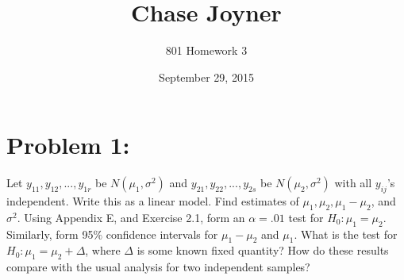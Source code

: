\documentclass[11pt]{article}
\title{Chase Joyner}
\author{801 Homework 3}
\date{September 29, 2015}
\begin{document}
\maketitle
\section*{Problem 1:}
Let $y_{11},y_{12},...,y_{1r}$ be $N(\mu_1,\sigma^2)$ and $y_{21},y_{22},...,y_{2s}$ be $N(\mu_2,\sigma^2)$ with all $y_{ij}$'s independent.  Write this as a linear model.  Find estimates of $\mu_1,\mu_2,\mu_1-\mu_2$, and $\sigma^2$.  Using Appendix E, and Exercise 2.1, form an $\alpha = .01$ test for $H_0\colon \mu_1 = \mu_2$.  Similarly, form 95$\%$ confidence intervals for $\mu_1-\mu_2$ and $\mu_1$.  What is the test for $H_0\colon\mu_1 = \mu_2 + \Delta$, where $\Delta$ is some known fixed quantity?  How do these results compare with the usual analysis for two independent samples?
\end{document}
